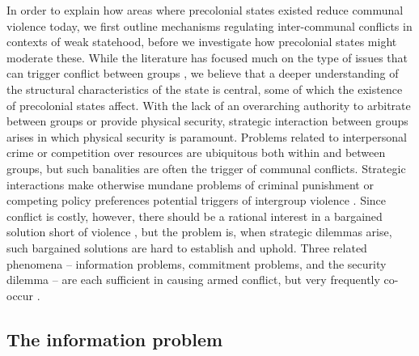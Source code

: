 \documentclass[12pt]{article}
\begin{document}
In order to explain how areas where precolonial states existed reduce communal
violence today, we first outline mechanisms regulating inter-communal conflicts
in contexts of weak statehood, before we investigate how precolonial states
might moderate these. While the literature has focused much on the type of
issues that can trigger conflict between groups \citep{Doring2020, Eck2014,
Elfversson2015, Fjelde2014, Fjelde2012, Hillesund_2017, Theisen2012}, we believe
that a deeper understanding of the structural characteristics of the state is
central, some of which the existence of precolonial states affect. With the lack
of an overarching authority to arbitrate between groups or provide physical
security, strategic interaction between groups arises in which physical security
is paramount. Problems related to interpersonal crime or competition over
resources are ubiquitous both within and between groups, but such banalities are
often the trigger of communal conflicts. Strategic interactions make otherwise
mundane problems of criminal punishment or competing policy preferences
potential triggers of intergroup violence \citep{diamond2013world, Eaton_2008,
Fearon1995, Fearon_1996, Lake_1996}. Since conflict is costly, however, there
should be a rational interest in a bargained solution short of violence
\citep{Fearon1995}, but the problem is, when strategic dilemmas arise, such
bargained solutions are hard to establish and uphold. Three related phenomena –
information problems, commitment problems, and the security dilemma – are each
sufficient in causing armed conflict, but very frequently co-occur
\citep[46]{Lake_1996}.

\subsection{The information problem}
\end{document}
